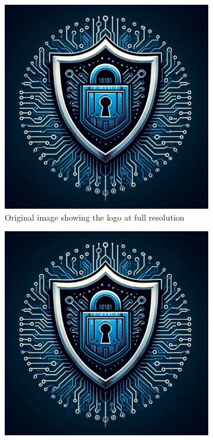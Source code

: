 \begin{figure}[htbp]
    \centering
    \begin{subfigure}[b]{0.45\textwidth}
        \centering
        \includegraphics[width=\textwidth]{content/images/logo.jpg}
        \caption{Original image showing the logo at full resolution}
        \label{fig:logo_original}
    \end{subfigure}
    \hfill
    \begin{subfigure}[b]{0.45\textwidth}
        \centering
        \includegraphics[width=\textwidth,angle=180]{content/images/logo.jpg}

\end{subfigure}
\end{figure}
